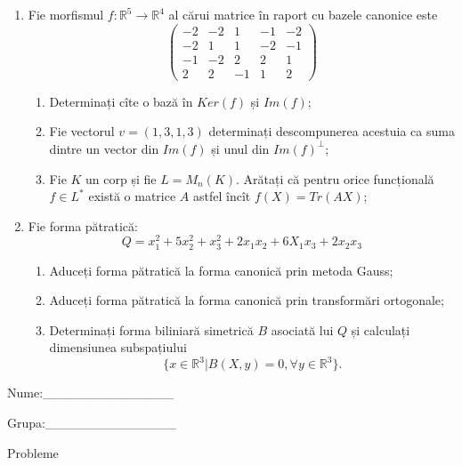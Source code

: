 \documentclass{article}
\begin{document}
\begin{enumerate}
 \item Fie morfismul $f:\mathbb{R}^5 \to \mathbb{R}^4$ al cărui matrice în raport cu bazele canonice este
$$\begin{pmatrix}
-2&-2&1&-1&-2\\
-2&1&1&-2&-1\\
-1&-2&2&2&1\\
2&2&-1&1&2
\end{pmatrix}$$

\begin{enumerate}
\item Determinați cîte o bază în $Ker(f)$ și $Im(f)$;
\item Fie vectorul $v=(1,3,1,3)$ determinați descompunerea acestuia ca suma dintre un vector din $Im(f)$ și unul din $Im(f)^\perp$;
\item Fie $K$ un corp și fie $L=M_n(K)$. Arătați că pentru orice funcțională $f \in L^*$ există o matrice $A$ astfel încît $f(X)=Tr(AX)$;
\end{enumerate}
\item Fie forma pătratică:
$$Q= x_1^2+5x_2^2+x_3^2+2x_1x_2+6X_1x_3+2x_2x_3$$

\begin{enumerate}
\item Aduceți forma pătratică la forma canonică prin metoda Gauss;
\item Aduceți forma pătratică la forma canonică prin transformări ortogonale;
\item Determinați forma biliniară simetrică $B$ asociată lui $Q$ și calculați dimensiunea subspațiului
$$\{x \in \mathbb{R}^3 | B(X,y)=0,\forall y \in \mathbb{R}^3\}.$$

\end{enumerate}
\end{enumerate}
\newpage
\begin{flushright}
Nume:\_\_\_\_\_\_\_\_\_\_\_\_\_\_
 
 
Grupa:\_\_\_\_\_\_\_\_\_\_\_\_\_\_
\end{flushright}
\begin{center}
\vspace{2cm}
{\Large Probleme}
\vspace{2cm}
\end{center}
\end{document}
